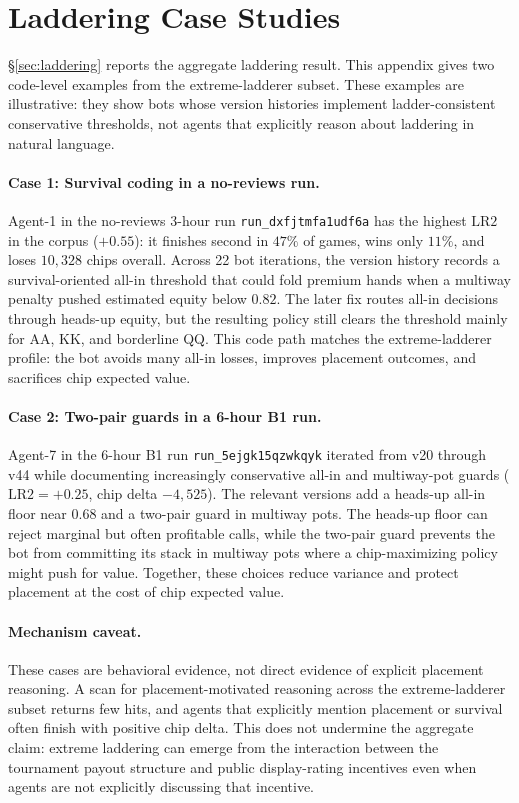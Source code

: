 \documentclass{article}
\begin{document}
\section{Laddering Case Studies}
\label{app:case-studies}

\S\ref{sec:laddering} reports the aggregate laddering result.
This appendix gives two code-level examples from the extreme-ladderer subset.
These examples are illustrative: they show bots whose version histories implement ladder-consistent conservative thresholds, not agents that explicitly reason about laddering in natural language.

\paragraph{Case 1: Survival coding in a no-reviews run.}
Agent-1 in the no-reviews 3-hour run \texttt{run\_dxfjtmfa1udf6a} has the highest $\mathrm{LR2}$ in the corpus ($+0.55$): it finishes second in $47\%$ of games, wins only $11\%$, and loses $10{,}328$ chips overall.
Across 22 bot iterations, the version history records a survival-oriented all-in threshold that could fold premium hands when a multiway penalty pushed estimated equity below $0.82$.
The later fix routes all-in decisions through heads-up equity, but the resulting policy still clears the threshold mainly for AA, KK, and borderline QQ.
This code path matches the extreme-ladderer profile: the bot avoids many all-in losses, improves placement outcomes, and sacrifices chip expected value.

\paragraph{Case 2: Two-pair guards in a 6-hour B1 run.}
Agent-7 in the 6-hour B1 run \texttt{run\_5ejgk15qzwkqyk} iterated from v20 through v44 while documenting increasingly conservative all-in and multiway-pot guards ($\mathrm{LR2}{=}{+}0.25$, chip delta $-4{,}525$).
The relevant versions add a heads-up all-in floor near $0.68$ and a two-pair guard in multiway pots.
The heads-up floor can reject marginal but often profitable calls, while the two-pair guard prevents the bot from committing its stack in multiway pots where a chip-maximizing policy might push for value.
Together, these choices reduce variance and protect placement at the cost of chip expected value.

\paragraph{Mechanism caveat.}
These cases are behavioral evidence, not direct evidence of explicit placement reasoning.
A scan for placement-motivated reasoning across the extreme-ladderer subset returns few hits, and agents that explicitly mention placement or survival often finish with positive chip delta.
This does not undermine the aggregate claim: extreme laddering can emerge from the interaction between the tournament payout structure and public display-rating incentives even when agents are not explicitly discussing that incentive.
\end{document}
